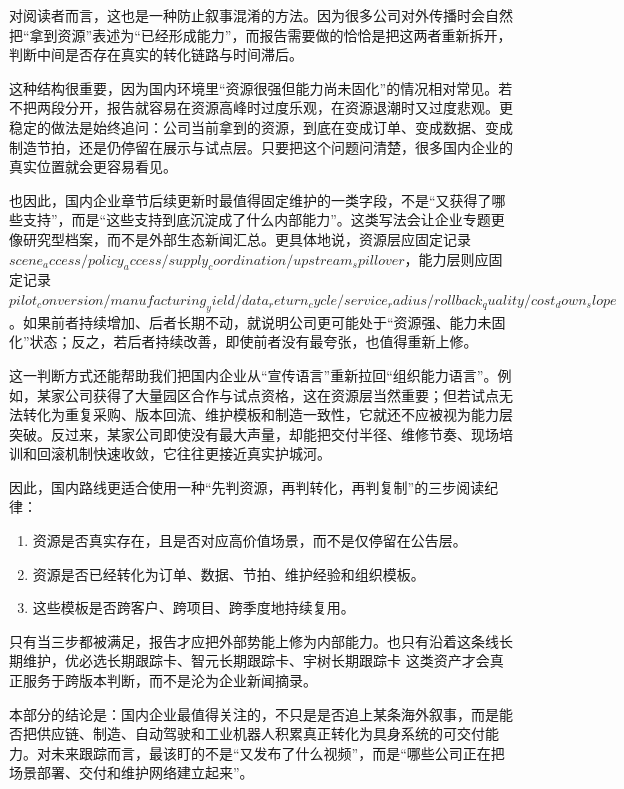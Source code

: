 对阅读者而言，这也是一种防止叙事混淆的方法。因为很多公司对外传播时会自然把“拿到资源”表述为“已经形成能力”，而报告需要做的恰恰是把这两者重新拆开，判断中间是否存在真实的转化链路与时间滞后。

这种结构很重要，因为国内环境里“资源很强但能力尚未固化”的情况相对常见。若不把两段分开，报告就容易在资源高峰时过度乐观，在资源退潮时又过度悲观。更稳定的做法是始终追问：公司当前拿到的资源，到底在变成订单、变成数据、变成制造节拍，还是仍停留在展示与试点层。只要把这个问题问清楚，很多国内企业的真实位置就会更容易看见。

也因此，国内企业章节后续更新时最值得固定维护的一类字段，不是“又获得了哪些支持”，而是“这些支持到底沉淀成了什么内部能力”。这类写法会让企业专题更像研究型档案，而不是外部生态新闻汇总。更具体地说，资源层应固定记录 \(\scriptstyle scene_access / policy_access / supply_coordination / upstream_spillover\)，能力层则应固定记录 \(\scriptstyle pilot_conversion / manufacturing_yield / data_return_cycle / service_radius / rollback_quality / cost_down_slope\)。如果前者持续增加、后者长期不动，就说明公司更可能处于“资源强、能力未固化”状态；反之，若后者持续改善，即使前者没有最夸张，也值得重新上修。

这一判断方式还能帮助我们把国内企业从“宣传语言”重新拉回“组织能力语言”。例如，某家公司获得了大量园区合作与试点资格，这在资源层当然重要；但若试点无法转化为重复采购、版本回流、维护模板和制造一致性，它就还不应被视为能力层突破。反过来，某家公司即使没有最大声量，却能把交付半径、维修节奏、现场培训和回滚机制快速收敛，它往往更接近真实护城河。

因此，国内路线更适合使用一种“先判资源，再判转化，再判复制”的三步阅读纪律：

\begin{enumerate}
\item 资源是否真实存在，且是否对应高价值场景，而不是仅停留在公告层。
\item 资源是否已经转化为订单、数据、节拍、维护经验和组织模板。
\item 这些模板是否跨客户、跨项目、跨季度地持续复用。
\end{enumerate}

只有当三步都被满足，报告才应把外部势能上修为内部能力。也只有沿着这条线长期维护，优必选长期跟踪卡、智元长期跟踪卡、宇树长期跟踪卡 这类资产才会真正服务于跨版本判断，而不是沦为企业新闻摘录。

本部分的结论是：国内企业最值得关注的，不只是是否追上某条海外叙事，而是能否把供应链、制造、自动驾驶和工业机器人积累真正转化为具身系统的可交付能力。对未来跟踪而言，最该盯的不是“又发布了什么视频”，而是“哪些公司正在把场景部署、交付和维护网络建立起来”。

